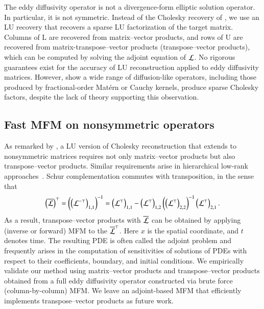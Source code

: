 \documentclass[11pt,sort&compress]{elsarticle}
\begin{document}
The eddy diffusivity operator is not a divergence-form elliptic solution operator. 
In particular, it is not symmetric. 
Instead of the Cholesky recovery of \citet{schaferSparseRecoveryElliptic2021}, we use an LU recovery that recovers a sparse LU factorization of the target matrix. 
Columns of $\mathrm{L}$ are recovered from matrix--vector products, and rows of $\mathrm{U}$ are recovered from matrix-transpose--vector products (transpose--vector products), which can be computed by solving the adjoint equation of $\mathcal{L}$.
No rigorous guarantees exist for the accuracy of LU reconstruction applied to eddy diffusivity matrices.
However, \citet{schafer2017compression} show a wide range of diffusion-like operators, including those produced by fractional-order Mat{\'e}rn or Cauchy kernels, produce sparse Cholesky factors, despite the lack of theory supporting this observation.

\subsection{Fast MFM on nonsymmetric operators}\label{s:fmfm}
As remarked by \citet{schaferSparseRecoveryElliptic2021}, a LU version of Cholesky reconstruction that extends to nonsymmetric matrices requires not only matrix--vector products but also transpose--vector products.
Similar requirements arise in hierarchical low-rank approaches~\citep{halko2011finding,lin2011fast}. 
Schur complementation commutes with transposition, in the sense that
\begin{gather}
    \left(\overline{\mathcal{L}}\right)^{\top}
    =
    \left(\left(\mathcal{L}^{-\top}\right)_{1, 1}\right)^{-1}
    =
    \left(\mathcal{L}^{\top}\right)_{1, 1} - \left(\mathcal{L}^{\top}\right)_{1, 2} \left(\left(\mathcal{L}^\top\right)_{2,2}\right)^{-1} \left(\mathcal{L}^\top\right)_{2 ,1} .
    \label{eqn:mfm_schur_transpose}
\end{gather}
As a result, transpose--vector products with $\overline{\mathcal{L}}$ can be obtained by applying (inverse or forward) MFM to the $\overline{\mathcal{L}}^{\top}$.
Here $x$ is the spatial coordinate, and $t$ denotes time.
The resulting PDE is often called the adjoint problem and frequently arises in the computation of sensitivities of solutions of PDEs with respect to their coefficients, boundary, and initial conditions.
We empirically validate our method using matrix--vector products and transpose--vector products obtained from a full eddy diffusivity operator constructed via brute force (column-by-column) MFM. 
We leave an adjoint-based MFM that efficiently implements transpose--vector products as future work.
\end{document}
